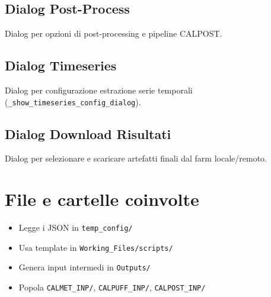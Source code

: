 \subsection{Dialog Post-Process}
Dialog per opzioni di post-processing e pipeline CALPOST.

\subsection{Dialog Timeseries}
Dialog per configurazione estrazione serie temporali (\texttt{\_show\_timeseries\_config\_dialog}).

\subsection{Dialog Download Risultati}
Dialog per selezionare e scaricare artefatti finali dal farm locale/remoto.

\section{File e cartelle coinvolte}
\begin{itemize}[leftmargin=1.5em]
  \item Legge i JSON in \texttt{temp\_config/}
  \item Usa template in \texttt{Working\_Files/scripts/}
  \item Genera input intermedi in \texttt{Outputs/}
  \item Popola \texttt{CALMET\_INP/}, \texttt{CALPUFF\_INP/}, \texttt{CALPOST\_INP/}
\end{itemize}
